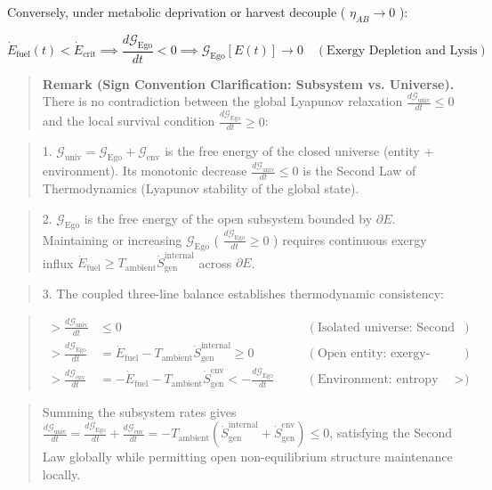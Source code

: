 \documentclass[11pt,a4paper]{article}
\theoremstyle{definition}
\theoremstyle{remark}
\begin{document}
Conversely, under metabolic deprivation or harvest decouple ( $\eta_{AB} \to 0$ ):


\begin{equation}
\boxed{\dot{E}_{\text{fuel}}(t) < \dot{E}_{\text{crit}} \implies \frac{d\mathcal{G}_{\text{Ego}}}{dt} < 0 \implies \mathcal{G}_{\text{Ego}}[E(t)] \longrightarrow 0 \quad (\text{Exergy Depletion  and  Lysis})}
\end{equation}


\begin{quote}\textbf{Remark (Sign Convention Clarification: Subsystem vs. Universe).} There is no contradiction between the global Lyapunov relaxation $\frac{d\mathcal{G}_{\text{univ}}}{dt} \le 0$ and the local survival condition $\frac{d\mathcal{G}_{\text{Ego}}}{dt} \ge 0$:\end{quote}
\begin{quote}1. $\mathcal{G}_{\text{univ}} = \mathcal{G}_{\text{Ego}} + \mathcal{G}_{\text{env}}$ is the free energy of the closed universe (entity + environment). Its monotonic decrease $\frac{d\mathcal{G}_{\text{univ}}}{dt} \le 0$ is the Second Law of Thermodynamics (Lyapunov stability of the global state).\end{quote}
\begin{quote}2. $\mathcal{G}_{\text{Ego}}$ is the free energy of the open subsystem bounded by $\partial E$. Maintaining or increasing $\mathcal{G}_{\text{Ego}}$ ( $\frac{d\mathcal{G}_{\text{Ego}}}{dt} \ge 0$ ) requires continuous exergy influx $\dot{E}_{\text{fuel}} \ge T_{\text{ambient}} \dot{S}_{\text{gen}}^{\text{internal}}$ across $\partial E$.\end{quote}
\begin{quote}3. The coupled three-line balance establishes thermodynamic consistency:\end{quote}
\begin{quote}
\begin{equation}
\begin{aligned}
> \frac{d\mathcal{G}_{\text{univ}}}{dt} &\le 0 \quad &&(\text{Isolated universe: Second Law / Lyapunov relaxation}) \\
> \frac{d\mathcal{G}_{\text{Ego}}}{dt} &= \dot{E}_{\text{fuel}} - T_{\text{ambient}} \dot{S}_{\text{gen}}^{\text{internal}} \ge 0 \quad &&(\text{Open entity: exergy-driven boundary persistence}) \\
> \frac{d\mathcal{G}_{\text{env}}}{dt} &= -\dot{E}_{\text{fuel}} - T_{\text{ambient}} \dot{S}_{\text{gen}}^{\text{env}} < -\frac{d\mathcal{G}_{\text{Ego}}}{dt} \quad &&(\text{Environment: entropy sink absorbing exported dissipation})
> \end{aligned}
\end{equation}
\end{quote}
\begin{quote}Summing the subsystem rates gives $\frac{d\mathcal{G}_{\text{univ}}}{dt} = \frac{d\mathcal{G}_{\text{Ego}}}{dt} + \frac{d\mathcal{G}_{\text{env}}}{dt} = -T_{\text{ambient}} (\dot{S}_{\text{gen}}^{\text{internal}} + \dot{S}_{\text{gen}}^{\text{env}}) \le 0$, satisfying the Second Law globally while permitting open non-equilibrium structure maintenance locally.\end{quote}
\end{document}
